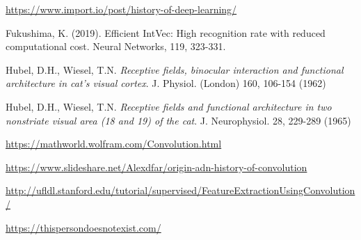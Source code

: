 \begin{thebibliography}{}
 \url{https://www.import.io/post/history-of-deep-learning/}

 Fukushima, K. (2019). Efficient IntVec: High recognition rate with reduced computational cost. Neural Networks, 119, 323-331.

 Hubel, D.H., Wiesel, T.N. \textit{Receptive fields, binocular interaction
and functional architecture in cat's visual cortex}. J. Physiol.
(London) 160, 106-154 (1962)

 Hubel, D.H., Wiesel, T.N. \textit{Receptive fields and functional architecture in two nonstriate visual area (18 and 19) of the cat}. J.
Neurophysiol. 28, 229-289 (1965)

 \url{https://mathworld.wolfram.com/Convolution.html}

 \url{https://www.slideshare.net/Alexdfar/origin-adn-history-of-convolution}

 \url{http://ufldl.stanford.edu/tutorial/supervised/FeatureExtractionUsingConvolution/}







 \url{https://thispersondoesnotexist.com/}















\end{thebibliography}